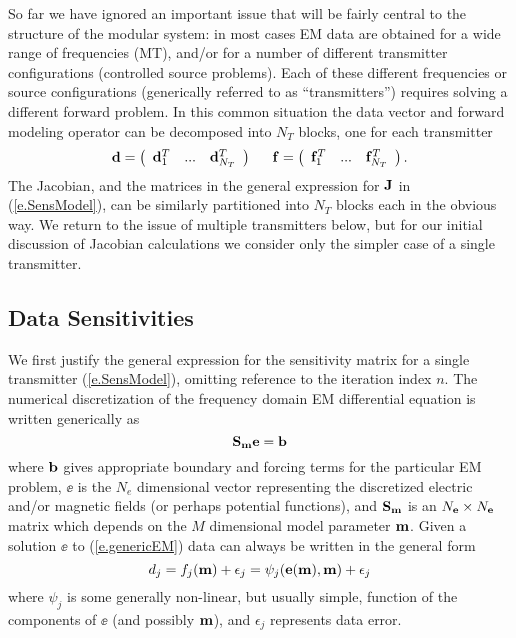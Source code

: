 So far we have ignored an
important issue that will be fairly central
to the structure of the modular system:
in most cases EM data are obtained for a wide
range of frequencies (MT),
and/or for a number of different transmitter
configurations (controlled source problems).
Each of these different frequencies or source configurations
(generically referred to as ``transmitters'')
requires solving a different forward problem.
In this common situation the data vector and
forward modeling operator can be decomposed into 
$N_T$ blocks, one for each transmitter
\begin{equation}
\label{e.dPartition}
{\bf d} = \left(
\begin{array}{c c c}
{\bf d}_1^T & ... & {\bf d}_{N_T}^T
\end{array}
\right)
\,\,\,\,\,\,\,\,\,
{\bf f} = \left(
\begin{array}{c c c}
{\bf f}_1^T & ...& {\bf f}_{N_T}^T 
\end{array}
\right)  .
\end{equation}
The Jacobian, and
the matrices in the general expression for ${\bf J}$ in (\ref{e.SensModel}),
can be similarly partitioned into $N_T$ blocks each in the obvious way.
We return to the issue of multiple transmitters below,
but for our initial discussion of Jacobian calculations 
we consider only the simpler case of a single transmitter.

\subsection{Data Sensitivities}

We first justify
the general expression for the sensitivity matrix
for a single transmitter (\ref{e.SensModel}),
omitting reference to the iteration index $n$.
The numerical discretization of the frequency domain EM 
differential equation is written generically as
\begin{equation}
\label{e.genericEM}
{\bf S}_{\bf m} {\bf e} = {\bf b}
\end{equation}
where ${\bf b}$ gives appropriate boundary and forcing terms
for the particular EM problem,
$\ee$ is the $N_e$ dimensional vector representing
the discretized electric and/or magnetic fields
(or perhaps potential functions), and
${\bf S}_{{\bf m}}$ is an $N_{\bf e} \times N_{\bf e}$
matrix which depends on the
$M$ dimensional model parameter ${\bf m}$.
Given a solution $\ee$ to (\ref{e.genericEM})
data can always be written in the general form
\begin{equation}
\label{e.genericData}
d_j = f_j( {\bf m} ) + \epsilon_j = \psi_j({\bf e}({\bf m}),{\bf m}) + \epsilon_j
\end{equation}
where $\psi_j$ is some generally non-linear, but usually simple,
function of the components of $\ee$ (and possibly ${\bf m}$), and
$\epsilon_j$ represents data error.

